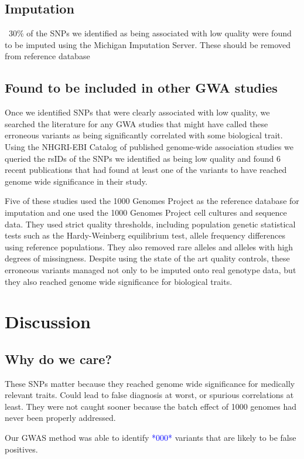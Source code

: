 \documentclass[12pt,twocolumn]{article}
\newcommand{\todo}[1]{\textcolor{blue}{*#1*}}
\begin{document}
	\subsection{Imputation}
~30\% of the SNPs we identified as being associated with low quality were found to be imputed using the Michigan Imputation Server. These  should be removed from reference database

	\subsection{Found to be included in other GWA studies}
Once we identified SNPs that were clearly associated with low quality, we searched the literature for any GWA studies that might have called these erroneous variants as being significantly correlated with some biological trait. 
Using the NHGRI-EBI Catalog of published genome-wide association studies we queried the rsIDs of the SNPs we identified as being low quality and found 6 recent publications that had found at least one of the variants to have reached genome wide significance in their study. 

Five of these studies used the 1000 Genomes Project as the reference database for imputation and one used the 1000 Genomes Project cell cultures and sequence data. 
They used strict quality thresholds, including population genetic statistical tests such as the Hardy-Weinberg equilibrium test, allele frequency differences using reference populations. 
They also removed rare alleles and alleles with high degrees of missingness. 
Despite using the state of the art quality controls, these erroneous variants managed not only to be imputed onto real genotype data, but they also reached genome wide significance for biological traits. 

			\section{Discussion}
\subsection{Why do we care?}
These SNPs matter because they reached genome wide significance for medically relevant traits. 
Could lead to false diagnosis at worst, or spurious correlations at least. 
They were not caught sooner because the batch effect of 1000 genomes had never been properly addressed. 

Our GWAS method was able to identify \todo{000} variants that are likely to be false positives.
\end{document}

